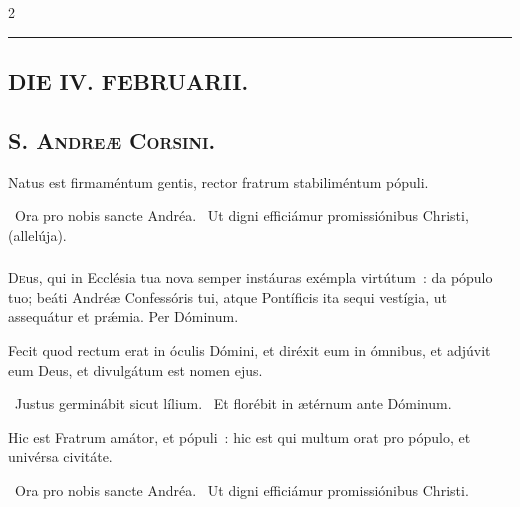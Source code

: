 \documentclass[9pt,twoside]{extarticle}
\begin{document}
\begin{multicols}{2}
\begin{center}\textcolor{red}{\rule{\linewidth}{0.5pt}} \end{center}

\subsection*{\center \textsc{DIE IV. FEBRUARII.}}
\subsubsection*{\center {}}
\subsection*{\center \textsc{S. Andreæ Corsini.}}

\begin{tightlist}{}
\item {}
\end{tightlist}

\begin{tightlist}{}
\item {} Natus est firmaméntum gentis, rector fratrum stabiliméntum pópuli.
\item {}~Ora pro nobis sancte Andréa. ~Ut digni efficiámur promissiónibus Christi, (allelúja).
\end{tightlist}
\subsubsection*{\center {}}
\lettrine{D}eus, qui in Ecclésia tua nova semper instáuras exémpla virtútum~: da pópulo tuo; beáti Andréæ Confessóris tui, atque Pontíficis ita sequi vestígia, ut assequátur et prǽmia. Per Dóminum.

\begin{tightlist}{}
\item {} Fecit quod rectum erat in óculis Dómini, et diréxit eum in ómnibus, et adjúvit eum Deus, et divulgátum est nomen ejus.
\item {}~Justus germinábit sicut lílium. ~Et florébit in ætérnum ante Dóminum.
\item {} Hic est Fratrum amátor, et pópuli~: hic est qui multum orat pro pópulo, et univérsa civitáte.
\item {}~Ora pro nobis sancte Andréa. ~Ut digni efficiámur promissiónibus Christi.
\end{tightlist}


\end{multicols}
\end{document}
